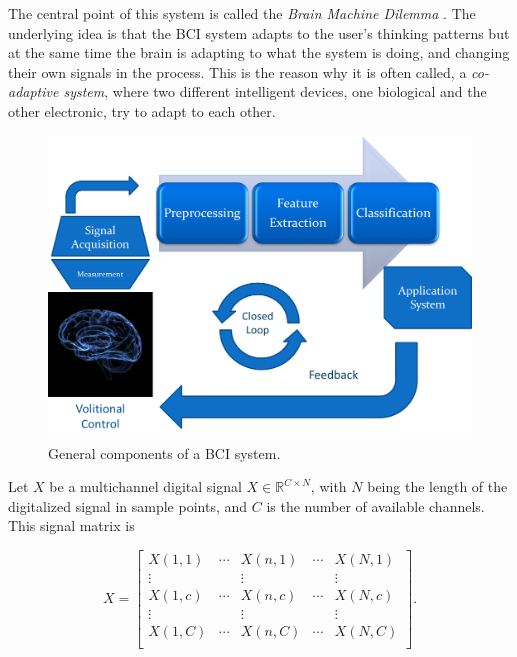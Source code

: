 The central point of this system is called the \textit{Brain Machine Dilemma} \cite{WolpawJonathanR2012}.  The underlying idea is that the BCI system adapts to the user's thinking patterns but at the same time the brain is adapting to what the system is doing, and changing their own signals in the process.  This is the reason why it is often called, a \textit{co-adaptive system}, where two different intelligent devices, one biological and the other electronic, try to adapt to each other.

\begin{figure}[]
\centering
\includegraphics[scale=0.5]{images/bcichart.png}
\caption[BCI Block Diagram]{General components of a BCI system.}
\label{fig:bciblockdiagram}
\end{figure}

Let $X$ be a multichannel digital signal $X \in \mathbb{R}^{C \times N}$,  with $N$ being the length of the digitalized signal in sample points, and $C$ is the number of available channels.  This signal matrix is 

\begin{equation}
X = \left[
\begin{matrix} 
X(1,1)  & \cdots & X(n,1) & \cdots & X(N,1) \\
\vdots &             & \vdots &            & \vdots \\
X(1,c)  & \cdots & X(n,c) & \cdots & X(N,c) \\
\vdots &             & \vdots &            & \vdots \\
X(1,C)  & \cdots & X(n,C) & \cdots & X(N,C) \\
\end{matrix}
\right]   .
\end{equation}

